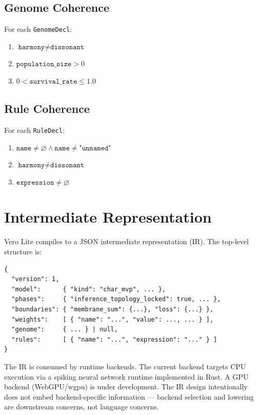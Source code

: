 \documentclass[11pt,a4paper]{article}
\begin{document}
\subsection{Genome Coherence}

For each \texttt{GenomeDecl}:

\begin{enumerate}
  \item $\texttt{harmony} \neq \texttt{dissonant}$
  \item $\texttt{population\_size} > 0$
  \item $0 < \texttt{survival\_rate} \leq 1.0$
\end{enumerate}

\subsection{Rule Coherence}

For each \texttt{RuleDecl}:

\begin{enumerate}
  \item $\texttt{name} \neq \varnothing \wedge \texttt{name} \neq \texttt{"unnamed"}$
  \item $\texttt{harmony} \neq \texttt{dissonant}$
  \item $\texttt{expression} \neq \varnothing$
\end{enumerate}

\section{Intermediate Representation}
\label{sec:ir}

Vero Lite compiles to a JSON intermediate representation (IR). The top-level structure is:

\begin{lstlisting}[language={},caption={Vero IR top-level structure (JSON).}]
{
  "version": 1,
  "model":      { "kind": "char_mvp", ... },
  "phases":     { "inference_topology_locked": true, ... },
  "boundaries": { "membrane_sum": {...}, "loss": {...} },
  "weights":    [ { "name": "...", "value": ..., ... } ],
  "genome":     { ... } | null,
  "rules":      [ { "name": "...", "expression": "..." } ]
}
\end{lstlisting}

The IR is consumed by runtime backends. The current backend targets CPU execution via a
spiking neural network runtime implemented in Rust. A GPU backend (WebGPU/wgpu) is under
development. The IR design intentionally does not embed backend-specific information ---
backend selection and lowering are downstream concerns, not language concerns.
\end{document}
